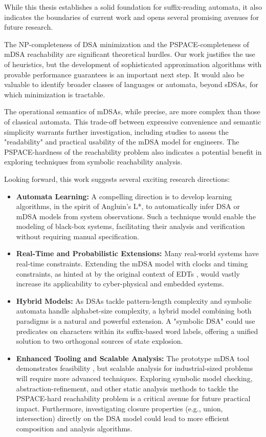 While this thesis establishes a solid foundation for suffix-reading automata, it also indicates the boundaries of current work and opens several promising avenues for future research.

The NP-completeness of DSA minimization and the PSPACE-completeness of mDSA reachability are significant theoretical hurdles. Our work justifies the use of heuristics, but the development of sophisticated approximation algorithms with provable performance guarantees is an important next step. It would also be valuable to identify broader classes of languages or automata, beyond sDSAs, for which minimization is tractable.

The operational semantics of mDSAs, while precise, are more complex than those of classical automata. This trade-off between expressive convenience and semantic simplicity warrants further investigation, including studies to assess the "readability" and practical usability of the mDSA model for engineers. The PSPACE-hardness of the reachability problem also indicates a potential benefit in exploring techniques from symbolic reachability analysis.

Looking forward, this work suggests several exciting research directions:

\begin{itemize}
    \item \textbf{Automata Learning:} A compelling direction is to develop learning algorithms, in the spirit of Angluin’s L*, to automatically infer DSA or mDSA models from system observations. Such a technique would enable the modeling of black-box systems, facilitating their analysis and verification without requiring manual specification.
    
    \item \textbf{Real-Time and Probabilistic Extensions:} Many real-world systems have real-time constraints. Extending the mDSA model with clocks and timing constraints, as hinted at by the original context of EDTs \cite{DBLP:conf/date/VenkateshSKA14}, would vastly increase its applicability to cyber-physical and embedded systems.
    
    \item \textbf{Hybrid Models:} As DSAs tackle pattern-length complexity and symbolic automata handle alphabet-size complexity, a hybrid model combining both paradigms is a natural and powerful extension. A "symbolic DSA" could use predicates on characters within its suffix-based word labels, offering a unified solution to two orthogonal sources of state explosion.
    
    \item \textbf{Enhanced Tooling and Scalable Analysis:} The prototype mDSA tool demonstrates feasibility \cite{mDSAcode}, but scalable analysis for industrial-sized problems will require more advanced techniques. Exploring symbolic model checking, abstraction-refinement, and other static analysis methods to tackle the PSPACE-hard reachability problem is a critical avenue for future practical impact. Furthermore, investigating closure properties (e.g., union, intersection) directly on the DSA model could lead to more efficient composition and analysis algorithms.
\end{itemize}

